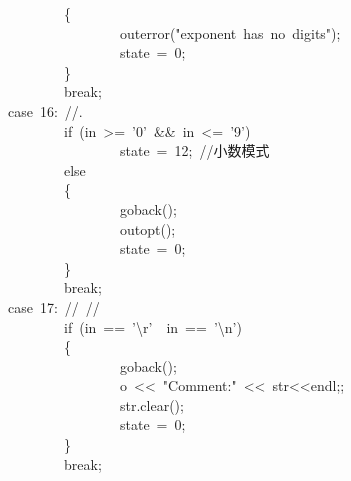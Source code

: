 \documentclass{article}
\begin{document}
\begin{mdpre}
~~~~~~~~~~~~~~~~~~~~~~~~\{\\
~~~~~~~~~~~~~~~~~~~~~~~~~~~~~~~~outerror({"}{exponent~has~no~digits}{"});\\
~~~~~~~~~~~~~~~~~~~~~~~~~~~~~~~~state~=~{0};\\
~~~~~~~~~~~~~~~~~~~~~~~~\}\\
~~~~~~~~~~~~~~~~~~~~~~~~{break};\\
~~~~~~~~~~~~~~~~{case}~{16}:~{//.}\\
~~~~~~~~~~~~~~~~~~~~~~~~{if}~(in~\textgreater{}=~{'0'}~\&\&~in~\textless{}=~{'9'})\\
~~~~~~~~~~~~~~~~~~~~~~~~~~~~~~~~state~=~{12};~{//小数模式}\\
~~~~~~~~~~~~~~~~~~~~~~~~{else}\\
~~~~~~~~~~~~~~~~~~~~~~~~\{\\
~~~~~~~~~~~~~~~~~~~~~~~~~~~~~~~~goback();\\
~~~~~~~~~~~~~~~~~~~~~~~~~~~~~~~~outopt();\\
~~~~~~~~~~~~~~~~~~~~~~~~~~~~~~~~state~=~{0};\\
~~~~~~~~~~~~~~~~~~~~~~~~\}\\
~~~~~~~~~~~~~~~~~~~~~~~~{break};\\
~~~~~~~~~~~~~~~~{case}~{17}:~{//~//}\\
~~~~~~~~~~~~~~~~~~~~~~~~{if}~(in~==~{'}{\textbackslash{}r}{'}~\textbar{}\textbar{}~in~==~{'}{\textbackslash{}n}{'})\\
~~~~~~~~~~~~~~~~~~~~~~~~\{\\
~~~~~~~~~~~~~~~~~~~~~~~~~~~~~~~~goback();\\
~~~~~~~~~~~~~~~~~~~~~~~~~~~~~~~~o~\textless{}\textless{}~{"}{Comment:}{"}~\textless{}\textless{}~str\textless{}\textless{}endl;;\\
~~~~~~~~~~~~~~~~~~~~~~~~~~~~~~~~str.clear();\\
~~~~~~~~~~~~~~~~~~~~~~~~~~~~~~~~state~=~{0};\\
~~~~~~~~~~~~~~~~~~~~~~~~\}\\
~~~~~~~~~~~~~~~~~~~~~~~~{break};\\

\end{mdpre}
\end{document}

